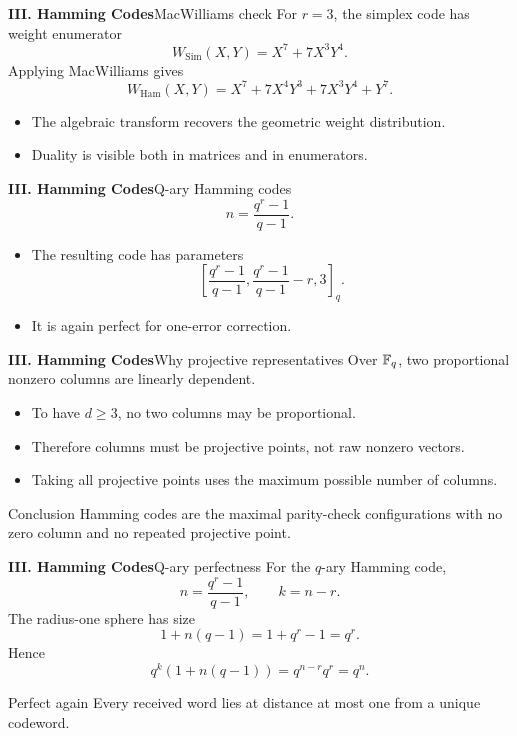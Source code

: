 \begin{frame}{\textbf{III. Hamming Codes}}{MacWilliams check}
\small
For $r=3$, the simplex code has weight enumerator
\[
  W_{\operatorname{Sim}}(X,Y)=X^7+7X^3Y^4.
\]
Applying MacWilliams gives
\[
  W_{\operatorname{Ham}}(X,Y)=X^7+7X^4Y^3+7X^3Y^4+Y^7.
\]
\begin{itemize}
  \item The algebraic transform recovers the geometric weight distribution.
  \item Duality is visible both in matrices and in enumerators.
\end{itemize}
\end{frame}

\begin{frame}{\textbf{III. Hamming Codes}}{Q-ary Hamming codes}
\small
{}
\[
  n=\frac{q^r-1}{q-1}.
\]
\begin{itemize}
  \item The resulting code has parameters
  \[
    \left[\frac{q^r-1}{q-1},\frac{q^r-1}{q-1}-r,3\right]_q.
  \]
  \item It is again perfect for one-error correction.
\end{itemize}
\end{frame}

\begin{frame}{\textbf{III. Hamming Codes}}{Why projective representatives}
\small
Over $\mathbb{F}_q$, two proportional nonzero columns are linearly dependent.
\begin{itemize}
  \item To have $d\ge3$, no two columns may be proportional.
  \item Therefore columns must be projective points, not raw nonzero vectors.
  \item Taking all projective points uses the maximum possible number of columns.
\end{itemize}
\begin{block}{Conclusion}
Hamming codes are the maximal parity-check configurations with no zero column and no repeated projective point.
\end{block}
\end{frame}

\begin{frame}{\textbf{III. Hamming Codes}}{Q-ary perfectness}
\small
For the $q$-ary Hamming code,
\[
  n=\frac{q^r-1}{q-1},\qquad k=n-r.
\]
The radius-one sphere has size
\[
  1+n(q-1)=1+q^r-1=q^r.
\]
Hence
\[
  q^k(1+n(q-1))=q^{n-r}q^r=q^n.
\]
\begin{block}{Perfect again}
Every received word lies at distance at most one from a unique codeword.
\end{block}
\end{frame}

